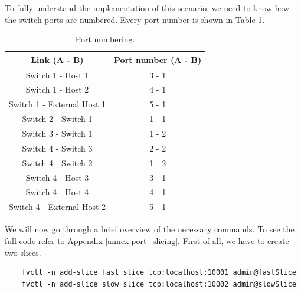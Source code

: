 To fully understand the implementation of this scenario, we need to know how the switch ports are numbered. Every port number is shown in Table \ref{tab:switch_ports}.

\begin{table}
    \centering
    \caption{Port numbering.}
    \vspace{0.1 cm}
    \begin{tabular}{c c}
    \hline
    \rowcolor{lightgray}
    \textbf{Link (A - B)}                        &\textbf{Port number (A - B)}     \\ \hline
    Switch 1 - Host 1                            & 3 - 1                           \\ \hline 
    Switch 1 - Host 2                            & 4 - 1                           \\ \hline 
    Switch 1 - External Host 1                   & 5 - 1                           \\ \hline 
    Switch 2 - Switch 1                          & 1 - 1                           \\ \hline 
    Switch 3 - Switch 1                          & 1 - 2                           \\ \hline 
    Switch 4 - Switch 3                          & 2 - 2                           \\ \hline 
    Switch 4 - Switch 2                          & 1 - 2                           \\ \hline 
    Switch 4 - Host 3                            & 3 - 1                           \\ \hline 
    Switch 4 - Host 4                            & 4 - 1                           \\ \hline 
    Switch 4 - External Host 2                   & 5 - 1                           \\ \hline 
    \end{tabular}
    \label{tab:switch_ports}
\end{table}

We will now go through a brief overview of the necessary commands. To see the full code refer to Appendix \ref{annex:port_slicing}. First of all, we have to create two slices.
\begin{lstlisting}
    fvctl -n add-slice fast_slice tcp:localhost:10001 admin@fastSlice
    fvctl -n add-slice slow_slice tcp:localhost:10002 admin@slowSlice
\end{lstlisting}

